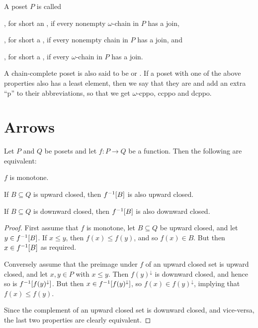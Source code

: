 \documentclass[a4paper, 11pt, article, danish, oneside]{memoir}
\DeclarePairedDelimiter{\auxdelimbracket}{[}{]}
\newcommand{\preim}[2][]{^{-1}\auxdelimbracket[#1]{#2}}
\begin{document}
\begin{definition}
    A poset $P$ is called
    \begin{enumdef}
        \item {}, for short an , if every nonempty $\omega$-chain in $P$ has a join,
        
        \item {}, for short a , if every nonempty chain in $P$ has a join, and
        
        \item {}, for short a , if every $\omega$-chain in $P$ has a join.
    \end{enumdef}
\end{definition}
%
A chain-complete poset is also said to be  or . If a poset with one of the above properties also has a least element, then we say that they are  and add an extra \enquote{p} to their abbreviations, so that we get $\omega$-cppo, ccppo and dcppo.


\section{Arrows}

\begin{proposition}
    Let $P$ and $Q$ be posets and let $f \colon P \to Q$ be a function. Then the following are equivalent:
    \begin{enumlem}
        \item $f$ is monotone.
        \item If $B \subseteq Q$ is upward closed, then $f\preim{B}$ is also upward closed.
        \item If $B \subseteq Q$ is downward closed, then $f\preim{B}$ is also downward closed.
    \end{enumlem}
\end{proposition}

\begin{proof}
    First assume that $f$ is monotone, let $B \subseteq Q$ be upward closed, and let $y \in f\preim{B}$. If $x \leq y$, then $f(x) \leq f(y)$, and so $f(x) \in B$. But then $x \in f\preim{B}$ as required.

    Conversely assume that the preimage under $f$ of an upward closed set is upward closed, and let $x,y \in P$ with $x \leq y$. Then $f(y)^\downarrow$ is downward closed, and hence so is $f\preim{f(y)^\downarrow}$. But then $x \in f\preim{f(y)^\downarrow}$, so $f(x) \in f(y)^\downarrow$, implying that $f(x) \leq f(y)$.

    Since the complement of an upward closed set is downward closed, and vice-versa, the last two properties are clearly equivalent.
\end{proof}
\end{document}
